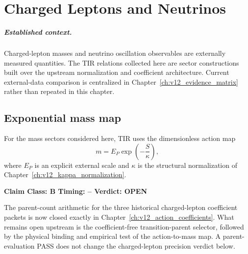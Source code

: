 \documentclass[11pt,a4paper,twoside]{book}
\theoremstyle{definition}
\newcommand{\vTwelveStatus}[3]{\par\noindent\textbf{Claim Class: #1 \quad Timing: #2 \quad Verdict: #3}\par}
\begin{document}
\chapter{Charged Leptons and Neutrinos}
\label{ch:v12_leptons_neutrinos}

\paragraph{Established context.}
Charged-lepton masses and neutrino oscillation observables are externally
measured quantities. The TIR relations collected here are sector constructions
built over the upstream normalization and coefficient architecture. Current
external-data comparison is centralized in Chapter~\ref{ch:v12_evidence_matrix}
rather than repeated in this chapter.

\section{Exponential mass map}
For the mass sectors considered here, TIR uses the dimensionless action map
\begin{equation}
\boxed{
m=E_P\exp\!\left(-\frac{S}{\kappa}\right),
}
\label{eq:v12-exponential-mass-map}
\end{equation}
where $E_P$ is an explicit external scale and $\kappa$ is the structural
normalization of Chapter~\ref{ch:v12_kappa_normalization}.

\vTwelveStatus{B}{--}{OPEN}
The parent-count arithmetic for the three historical charged-lepton coefficient
packets is now closed exactly in
Chapter~\ref{ch:v12_action_coefficients}. What remains open upstream is the
coefficient-free transition-parent selector, followed by the physical binding
and empirical test of the action-to-mass map. A parent-evaluation PASS does not
change the charged-lepton precision verdict below.
\end{document}
